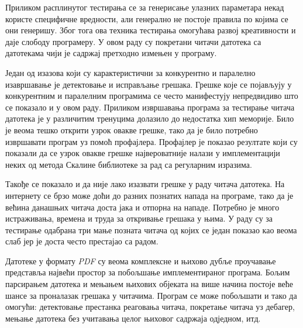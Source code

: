 \documentclass[12pt,oneside]{memoir}
\begin{document}
Приликом расплинутог тестирања се за генерисање улазних параметара некад користе специфичне вредности, али генерално не постоје правила по којима се они генеришу. Због тога ова техника тестирања омогућава развој креативности и даје слободу програмеру. У овом раду су покретани читачи датотека са датотекама чији је садржај претходно измењен у програму. 

Један од изазова који су карактеристични за конкурентно и паралелно изавршавање је детектовање и исправљање грешака. Грешке које се појављују у конкурентним и паралелним програмима се често манифестују непредвидиво што се показало и у овом раду. Приликом извршавања програма за тестирање читача датотека је у различитим тренуцима долазило до недостатка хип меморије. Било је веома тешко открити узрок овакве грешке, тако да је било потребно извршавати програм уз помоћ профајлера. Профајлер је показао резултате који су показали да се узрок овакве грешке највероватније налази у имплементацији неких од метода Скалине библиотеке за рад са регуларним изразима.

Такође се показало и да није лако изазвати грешке у раду читача датотека. На интернету се брзо може доћи до разних познатих напада на програме, тако да је већина данашњих читача доста јака и отпорна на нападе. Потребно је много истраживања, времена и труда за откривање грешака у њима. У раду су за тестирање одабрана три мање позната читача од којих се један показао као веома слаб јер је доста често престајао са радом. 

Датотеке у формату \textit{PDF} су веома комплексне и њихово дубље проучавање представља највећи простор за побољшање имплементираног програма. Бољим парсирањем датотека и мењањем њихових објеката на више начина постоје веће шансе за проналазак грешака у читачима. Програм се може побољшати и тако да омогући: детектовање престанка реаговања читача, покретање читача уз дебагер, мењање датотека без учитавања целог њиховог садржаја одједном, итд. 


\literatura

\backmatter
\end{document}
